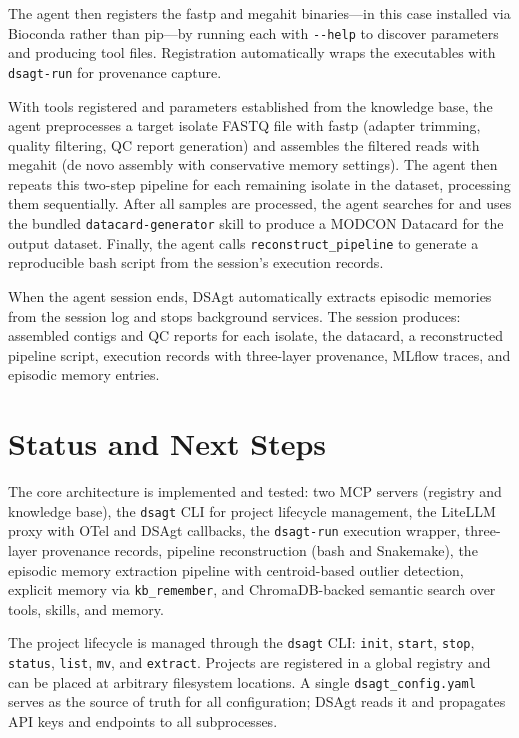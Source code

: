 \documentclass[11pt]{article}
\begin{document}
The agent then registers the fastp and megahit binaries---in
this case installed via Bioconda rather than pip---by running
each with \texttt{-{}-help} to discover parameters and
producing tool files.
Registration automatically wraps the executables with
\texttt{dsagt-run} for provenance capture.

With tools registered and parameters established from the
knowledge base, the agent preprocesses a target isolate
FASTQ file with fastp (adapter trimming, quality filtering,
QC report generation) and assembles the filtered reads with
megahit (de novo assembly with conservative memory settings).
The agent then repeats this two-step pipeline for each
remaining isolate in the dataset, processing them
sequentially.
After all samples are processed, the agent searches for and
uses the bundled \texttt{datacard-generator} skill to produce
a MODCON Datacard for the output dataset.
Finally, the agent calls \texttt{reconstruct\_pipeline} to
generate a reproducible bash script from the session's
execution records.

When the agent session ends, DSAgt automatically extracts
episodic memories from the session log and stops background
services.
The session produces: assembled contigs and QC reports for
each isolate, the datacard, a reconstructed pipeline script,
execution records with three-layer provenance, MLflow traces,
and episodic memory entries.


\section{Status and Next Steps}

The core architecture is implemented and tested: two MCP
servers (registry and knowledge base), the \texttt{dsagt} CLI
for project lifecycle management, the LiteLLM proxy with
OTel and DSAgt callbacks, the \texttt{dsagt-run} execution
wrapper, three-layer provenance records, pipeline
reconstruction (bash and Snakemake), the episodic memory
extraction pipeline with centroid-based outlier detection,
explicit memory via \texttt{kb\_remember}, and ChromaDB-backed
semantic search over tools, skills, and memory.

The project lifecycle is managed through the \texttt{dsagt}
CLI: \texttt{init}, \texttt{start}, \texttt{stop},
\texttt{status}, \texttt{list}, \texttt{mv}, and
\texttt{extract}.
Projects are registered in a global registry and can be
placed at arbitrary filesystem locations.
A single \texttt{dsagt\_config.yaml} serves as the source of
truth for all configuration; DSAgt reads it and propagates
API keys and endpoints to all subprocesses.
\end{document}
